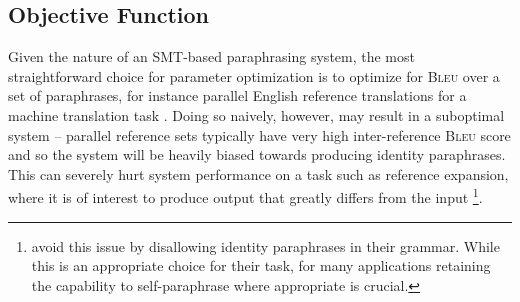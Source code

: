 \documentclass[11pt]{article}
\begin{document}

\subsection{Objective Function}
\label{objective-fn}

Given the nature of an SMT-based paraphrasing system, the most
straightforward choice for parameter optimization is to optimize for
\textsc{Bleu} over a set of paraphrases, for instance parallel English
reference translations for a machine translation task
\cite{Madnani2007}. Doing so naively, however, may result in a
suboptimal system -- parallel reference sets typically have very high
inter-reference \textsc{Bleu} score and so the system will be heavily
biased towards producing identity paraphrases. This can severely hurt
system performance on a task such as reference expansion, where it is
of interest to produce output that greatly differs from the input
\footnote{ avoid this issue by disallowing
  identity paraphrases in their grammar. While this is an appropriate
  choice for their task, for many applications retaining the
  capability to self-paraphrase where appropriate is crucial.}.
\end{document}
